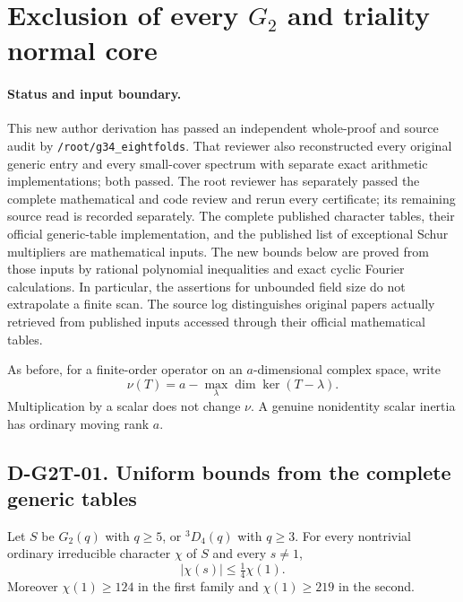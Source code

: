 \section{Exclusion of every $G_2$ and triality normal core}
\label{sec:g2-triality-cores}

\paragraph{Status and input boundary.}
This new author derivation has passed an independent whole-proof and
source audit by \texttt{/root/g34\_eightfolds}.  That reviewer also
reconstructed every original generic entry and every small-cover spectrum
with separate exact arithmetic implementations; both passed.  The
root reviewer has separately passed the complete mathematical and code
review and rerun every certificate; its remaining source read is
recorded separately.  The complete published
character tables, their official generic-table implementation, and the
published list of exceptional Schur multipliers are mathematical inputs.
The new bounds below are proved from those inputs by rational polynomial
inequalities and exact cyclic Fourier calculations.  In particular, the
assertions for unbounded field size do not extrapolate a finite scan.
The source log distinguishes original papers actually retrieved from
published inputs accessed through their official mathematical tables.

As before, for a finite-order operator on an $a$-dimensional complex space,
write
\[
 \nu(T)=a-\max_{\lambda}\dim\ker(T-\lambda).
\]
Multiplication by a scalar does not change $\nu$.  A genuine nonidentity
scalar inertia has ordinary moving rank $a$.

\subsection*{D-G2T-01. Uniform bounds from the complete generic tables}

\begin{lemma}
\label{D-G2T-01}
Let $S$ be $G_2(q)$ with $q\ge5$, or ${}^3D_4(q)$ with $q\ge3$.
For every nontrivial ordinary irreducible character $\chi$ of $S$ and
every $s\ne1$,
\[
                  |\chi(s)|\le\tfrac14\chi(1).             \tag{G2T.1}
\]
Moreover $\chi(1)\ge124$ in the first family and
$\chi(1)\ge219$ in the second.
\end{lemma}

